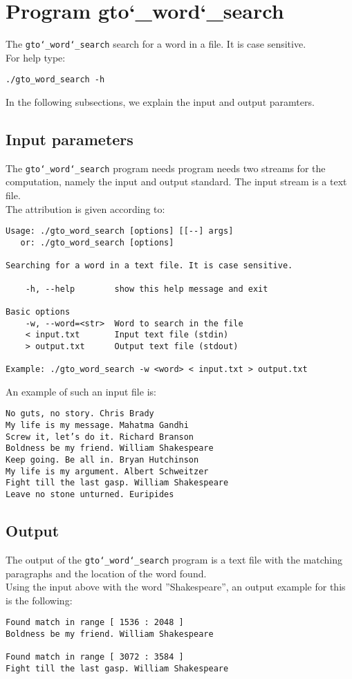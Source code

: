 \section{Program gto\char`_word\char`_search}
The \texttt{gto\char`_word\char`_search} search for a word in a file. It is case sensitive.\\
For help type:
\begin{lstlisting}
./gto_word_search -h
\end{lstlisting}
In the following subsections, we explain the input and output paramters.

\subsection*{Input parameters}

The \texttt{gto\char`_word\char`_search} program needs program needs two streams for the computation, namely the input and output standard. The input stream is a text file.\\
The attribution is given according to:
\begin{lstlisting}
Usage: ./gto_word_search [options] [[--] args]
   or: ./gto_word_search [options]

Searching for a word in a text file. It is case sensitive.

    -h, --help        show this help message and exit

Basic options
    -w, --word=<str>  Word to search in the file
    < input.txt       Input text file (stdin)
    > output.txt      Output text file (stdout)

Example: ./gto_word_search -w <word> < input.txt > output.txt
\end{lstlisting}
An example of such an input file is:
\begin{lstlisting}
No guts, no story. Chris Brady
My life is my message. Mahatma Gandhi
Screw it, let’s do it. Richard Branson
Boldness be my friend. William Shakespeare
Keep going. Be all in. Bryan Hutchinson
My life is my argument. Albert Schweitzer
Fight till the last gasp. William Shakespeare
Leave no stone unturned. Euripides
\end{lstlisting}

\subsection*{Output}
The output of the \texttt{gto\char`_word\char`_search} program is a text file with the matching paragraphs and the location of the word found.\\
Using the input above with the word ''Shakespeare'', an output example for this is the following:
\begin{lstlisting}
Found match in range [ 1536 : 2048 ]
Boldness be my friend. William Shakespeare

Found match in range [ 3072 : 3584 ]
Fight till the last gasp. William Shakespeare
\end{lstlisting}